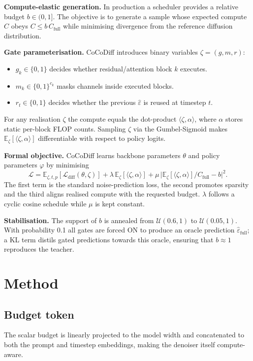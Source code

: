\documentclass{article} %
\begin{document}
\textbf{Compute-elastic generation.} In production a scheduler provides a relative budget \(b\in(0,1]\). The objective is to generate a sample whose expected compute \(C\) obeys \(C\le b\,C_{\text{full}}\) while minimising divergence from the reference diffusion distribution.

\textbf{Gate parameterisation.} CoCoDiff introduces binary variables \(\zeta=(g,m,r)\):
\begin{itemize}
\item \(g_{k}\in\{0,1\}\) decides whether residual/attention block \(k\) executes.
\item \(m_{k}\in\{0,1\}^{c_{k}}\) masks channels inside executed blocks.
\item \(r_{t}\in\{0,1\}\) decides whether the previous \(\hat{\varepsilon}\) is reused at timestep \(t\).
\end{itemize}
For any realisation \(\zeta\) the compute equals the dot-product \(\langle\zeta,\alpha\rangle\), where \(\alpha\) stores static per-block FLOP counts. Sampling \(\zeta\) via the Gumbel-Sigmoid makes \(\mathbb{E}_{\zeta}[\langle\zeta,\alpha\rangle]\) differentiable with respect to policy logits.

\textbf{Formal objective.} CoCoDiff learns backbone parameters \(\theta\) and policy parameters \(\varphi\) by minimising
\[
\mathcal{L}=\mathbb{E}_{\zeta,t,p}[\mathcal{L}_{\text{diff}}(\theta,\zeta)]
+\lambda\,\mathbb{E}_{\zeta}[\langle\zeta,\alpha\rangle]
+\mu\,\bigl|\mathbb{E}_{\zeta}[\langle\zeta,\alpha\rangle]/C_{\text{full}}-b\bigr|^{2}.
\]
The first term is the standard noise-prediction loss, the second promotes sparsity and the third aligns realised compute with the requested budget. \(\lambda\) follows a cyclic cosine schedule while \(\mu\) is kept constant.

\textbf{Stabilisation.} The support of \(b\) is annealed from \(\mathcal{U}(0.6,1)\) to \(\mathcal{U}(0.05,1)\). With probability 0.1 all gates are forced ON to produce an oracle prediction \(\hat{\varepsilon}_{\text{full}}\); a KL term distils gated predictions towards this oracle, ensuring that \(b\approx1\) reproduces the teacher.

\section{Method}
\label{sec:method}
\subsection{Budget token}
The scalar budget is linearly projected to the model width and concatenated to both the prompt and timestep embeddings, making the denoiser itself compute-aware.
\end{document}
